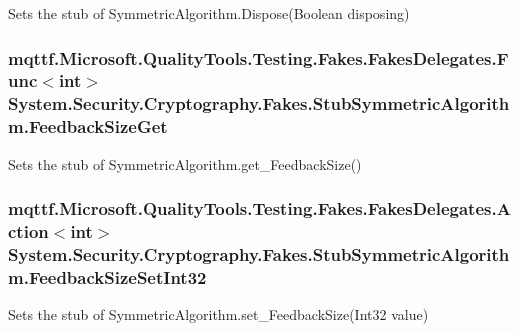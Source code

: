 Sets the stub of Symmetric\-Algorithm.\-Dispose(\-Boolean disposing)

\hypertarget{class_system_1_1_security_1_1_cryptography_1_1_fakes_1_1_stub_symmetric_algorithm_a333b2f0b29a96eff7e4a49ad5e066b1d}{
\subsubsection[{Feedback\-Size\-Get}]{\setlength{\rightskip}{0pt plus 5cm}mqttf.\-Microsoft.\-Quality\-Tools.\-Testing.\-Fakes.\-Fakes\-Delegates.\-Func$<$int$>$ System.\-Security.\-Cryptography.\-Fakes.\-Stub\-Symmetric\-Algorithm.\-Feedback\-Size\-Get}}\label{class_system_1_1_security_1_1_cryptography_1_1_fakes_1_1_stub_symmetric_algorithm_a333b2f0b29a96eff7e4a49ad5e066b1d}


Sets the stub of Symmetric\-Algorithm.\-get\-\_\-\-Feedback\-Size()

\hypertarget{class_system_1_1_security_1_1_cryptography_1_1_fakes_1_1_stub_symmetric_algorithm_a65edd7fa57a2c9b6cdc229d5095c477a}{
\subsubsection[{Feedback\-Size\-Set\-Int32}]{\setlength{\rightskip}{0pt plus 5cm}mqttf.\-Microsoft.\-Quality\-Tools.\-Testing.\-Fakes.\-Fakes\-Delegates.\-Action$<$int$>$ System.\-Security.\-Cryptography.\-Fakes.\-Stub\-Symmetric\-Algorithm.\-Feedback\-Size\-Set\-Int32}}\label{class_system_1_1_security_1_1_cryptography_1_1_fakes_1_1_stub_symmetric_algorithm_a65edd7fa57a2c9b6cdc229d5095c477a}


Sets the stub of Symmetric\-Algorithm.\-set\-\_\-\-Feedback\-Size(\-Int32 value)

